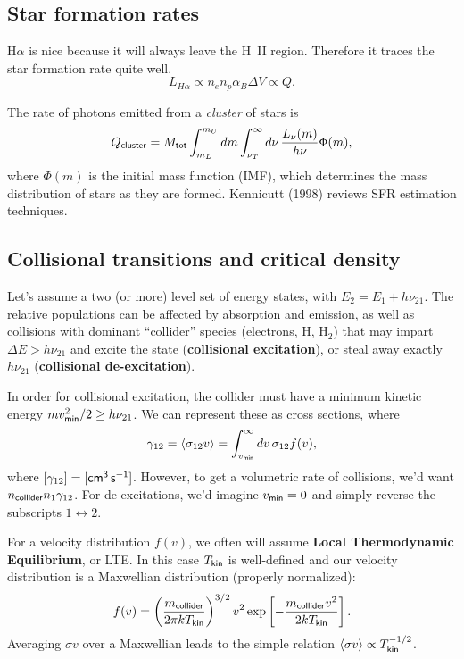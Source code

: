 \documentclass{tufte-handout}
\renewcommand{\textbf}[1]{{\bf \textcolor{dark-gray}{#1}}}
\renewcommand{\rm}{\sf}
\newcommand{\HII}{\textnormal{H{\smaller~\textsc{II}}}}
\begin{document}
\subsection{Star formation rates}

H$\alpha$ is nice because it will always leave the \HII{} region. Therefore it traces the star formation rate quite well.
\begin{equation}
L_{H\alpha} \propto n_e n_p \alpha_B \Delta V \propto Q.
\end{equation}

The rate of photons emitted from a \textit{cluster} of stars is
\begin{equation}
Q_{\rm cluster} = M_{\rm tot} \int_{m_{L}}^{m_U} dm \int_{\nu_T}^\infty d\nu\, \frac{L_\nu(m)}{h\nu}\Phi(m),
\end{equation}
where $\Phi(m)$ is the initial mass function (IMF), which determines the mass distribution of stars as they are formed. Kennicutt (1998) reviews SFR estimation techniques.

\subsection{Collisional transitions and critical density}
Let's assume a two (or more) level set of energy states, with $E_2 = E_1 + h\nu_{21}$. The relative populations can be affected by absorption and emission, as well as collisions with dominant ``collider'' species (electrons, H, H$_2$) that may impart $\Delta E>h\nu_{21}$ and excite the state (\textbf{collisional excitation}), or steal away exactly $h\nu_{21}$ (\textbf{collisional de-excitation}).

In order for collisional excitation, the collider must have a minimum kinetic energy $mv_{\rm min}^2 / 2 \geq h\nu_{21}$. We can represent these as cross sections, where
\begin{equation}
\gamma_{12}= \left \langle \sigma_{12}v\right \rangle = \int_{v_{\rm min}}^\infty dv\, \sigma_{12} f(v),
\end{equation}
where $[\gamma_{12}] = [{\rm cm^3\, s^{-1}}]$. However, to get a volumetric rate of collisions, we'd want $n_{\rm collider}n_1\gamma_{12}$. For de-excitations, we'd imagine $v_{\rm min} =0$ and simply reverse the subscripts $1 \leftrightarrow 2$.

For a velocity distribution $f(v)$, we often will assume \textbf{Local Thermodynamic Equilibrium}, or LTE. In this case $T_{\rm kin}$ is well-defined and our velocity distribution is a Maxwellian distribution (properly normalized):
\begin{equation}
f(v) =\left (\frac{m_{\rm collider}}{2\pi k T_{\rm kin}}\right )^{3/2} v^2 \exp\left [-\frac{m_{\rm collider} v^2}{2 k T_{\rm kin}}\right ].
\end{equation}
Averaging $\sigma v$ over a Maxwellian leads to the simple relation $\langle \sigma v \rangle \propto T_{\rm kin}^{-1/2}$.
\end{document}
